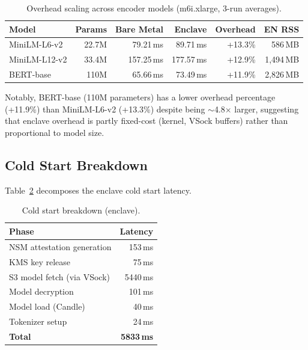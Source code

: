 \documentclass[11pt,a4paper]{article}
\newcommand{\BenchInstance}{m6i.xlarge}
\newcommand{\BenchModelName}{MiniLM-L6-v2}
\newcommand{\BenchModelParams}{22.7M}
\newcommand{\BenchNumRuns}{3}
\newcommand{\BenchBareMeanMs}{79.21}
\newcommand{\BenchEnclaveMeanMs}{89.71}
\newcommand{\BenchOverheadPct}{13.3\%}
\newcommand{\BenchEnclavePeakRssMb}{586}
\newcommand{\BenchAttestationMs}{153}
\newcommand{\BenchKmsMs}{75}
\newcommand{\BenchSThreeFetchMs}{5440}
\newcommand{\BenchDecryptMs}{101}
\newcommand{\BenchLoadMs}{40}
\newcommand{\BenchTokenizerMs}{24}
\newcommand{\BenchColdStartTotalMs}{5833}
\newcommand{\ModelLTwelveBareMeanMs}{157.25}
\newcommand{\ModelLTwelveEnclaveMeanMs}{177.57}
\newcommand{\ModelLTwelveOverheadPct}{12.9\%}
\newcommand{\ModelLTwelveParams}{33.4M}
\newcommand{\ModelBertBaseBareMeanMs}{65.66}
\newcommand{\ModelBertBaseEnclaveMeanMs}{73.49}
\newcommand{\ModelBertBaseOverheadPct}{11.9\%}
\newcommand{\ModelBertBaseParams}{110M}
\begin{document}
\begin{table}[ht]
\centering
\caption{Overhead scaling across encoder models (\BenchInstance{}, \BenchNumRuns{}-run averages).}
\label{tab:model-scaling}
\begin{tabular}{lrrrrr}
\hline
\textbf{Model} & \textbf{Params} & \textbf{Bare Metal} & \textbf{Enclave} & \textbf{Overhead} & \textbf{EN RSS} \\
\hline
\BenchModelName{} & \BenchModelParams{} & \BenchBareMeanMs{}\,ms & \BenchEnclaveMeanMs{}\,ms & +\BenchOverheadPct{} & \BenchEnclavePeakRssMb{}\,MB \\
MiniLM-L12-v2 & \ModelLTwelveParams{} & \ModelLTwelveBareMeanMs{}\,ms & \ModelLTwelveEnclaveMeanMs{}\,ms & +\ModelLTwelveOverheadPct{} & 1{,}494\,MB \\
BERT-base & \ModelBertBaseParams{} & \ModelBertBaseBareMeanMs{}\,ms & \ModelBertBaseEnclaveMeanMs{}\,ms & +\ModelBertBaseOverheadPct{} & 2{,}826\,MB \\
\hline
\end{tabular}
\end{table}

Notably, BERT-base (110M parameters) has a lower overhead percentage (+\ModelBertBaseOverheadPct{}) than \BenchModelName{} (+\BenchOverheadPct{}) despite being $\sim$4.8$\times$ larger, suggesting that enclave overhead is partly fixed-cost (kernel, VSock buffers) rather than proportional to model size.

\subsection{Cold Start Breakdown}

Table~\ref{tab:coldstart} decomposes the enclave cold start latency.

\begin{table}[ht]
\centering
\caption{Cold start breakdown (enclave).}
\label{tab:coldstart}
\begin{tabular}{lr}
\hline
\textbf{Phase} & \textbf{Latency} \\
\hline
NSM attestation generation & \BenchAttestationMs{}\,ms \\
KMS key release            & \BenchKmsMs{}\,ms \\
S3 model fetch (via VSock) & \BenchSThreeFetchMs{}\,ms \\
Model decryption           & \BenchDecryptMs{}\,ms \\
Model load (Candle)        & \BenchLoadMs{}\,ms \\
Tokenizer setup            & \BenchTokenizerMs{}\,ms \\
\hline
\textbf{Total}             & \textbf{\BenchColdStartTotalMs{}\,ms} \\
\hline
\end{tabular}
\end{table}
\end{document}
